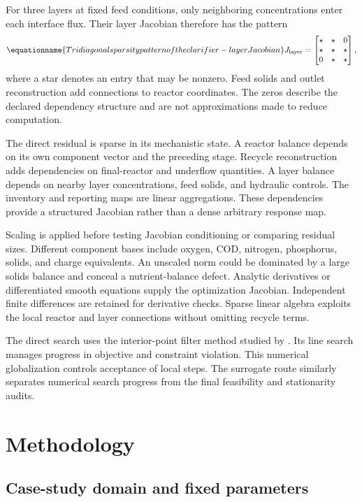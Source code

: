For three layers at fixed feed conditions, only neighboring concentrations enter each interface flux. Their layer Jacobian therefore has the pattern
\begin{equation}
\equationname{Tridiagonal sparsity pattern of the clarifier-layer Jacobian}
J_{\rm layer}=\begin{bmatrix}\star&\star&0\\\star&\star&\star\\0&\star&\star\end{bmatrix},
\end{equation}
where a star denotes an entry that may be nonzero. Feed solids and outlet reconstruction add connections to reactor coordinates. The zeros describe the declared dependency structure and are not approximations made to reduce computation.

The direct residual is sparse in its mechanistic state. A reactor balance depends on its own component vector and the preceding stage. Recycle reconstruction adds dependencies on final-reactor and underflow quantities. A layer balance depends on nearby layer concentrations, feed solids, and hydraulic controls. The inventory and reporting maps are linear aggregations. These dependencies provide a structured Jacobian rather than a dense arbitrary response map.

Scaling is applied before testing Jacobian conditioning or comparing residual sizes. Different component bases include oxygen, COD, nitrogen, phosphorus, solids, and charge equivalents. An unscaled norm could be dominated by a large solids balance and conceal a nutrient-balance defect. Analytic derivatives or differentiated smooth equations supply the optimization Jacobian. Independent finite differences are retained for derivative checks. Sparse linear algebra exploits the local reactor and layer connections without omitting recycle terms.

The direct search uses the interior-point filter method studied by \citet{WachterBiegler2006}. Its line search manages progress in objective and constraint violation. This numerical globalization controls acceptance of local steps. The surrogate route similarly separates numerical search progress from the final feasibility and stationarity audits.

\section{Methodology}

\subsection{Case-study domain and fixed parameters}

